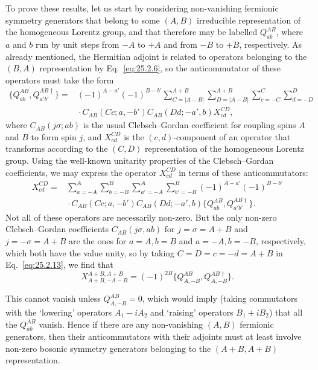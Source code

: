 To prove these results, let us start by considering non-vanishing fermionic
symmetry generators that belong to some \((A,B)\) irreducible representation
of the homogeneous Lorentz group, and that therefore may be labelled
\(Q_{ab}^{AB}\), where \(a\) and \(b\) run by unit steps from \(-A\) to
\(+A\) and from \(-B\) to \(+B\), respectively. As already mentioned, the
Hermitian adjoint is related to operators belonging to the \((B,A)\)
representation by Eq.~\eqref{eq:25.2.6}, so the anticommutator of these
operators must take the form
\begin{equation}
\begin{aligned}
\{Q_{ab}^{AB},Q_{a'b'}^{AB\dagger}\}
={}&(-1)^{A-a'}(-1)^{B-b'}
\sum_{C=|A-B|}^{A+B}
\sum_{D=|A-B|}^{A+B}
\sum_{c=-C}^{C}
\sum_{d=-D}^{D}
\\
&{}\cdot C_{AB}(Cc;a,-b')C_{AB}(Dd;-a',b)X_{cd}^{CD},
\end{aligned}
\tag{25.2.12}\label{eq:25.2.12}
\end{equation}
where \(C_{AB}(j\sigma;ab)\) is the usual Clebsch--Gordan coefficient for
coupling spins \(A\) and \(B\) to form spin \(j\), and \(X_{cd}^{CD}\) is
the \((c,d)\)-component of an operator that transforms according to the
\((C,D)\) representation of the homogeneous Lorentz group. Using the
well-known unitarity properties of the Clebsch--Gordan coefficients, we may
express the operator \(X_{cd}^{CD}\) in terms of these anticommutators:
\begin{equation}
\begin{aligned}
X_{cd}^{CD}
={}&
\sum_{a=-A}^{A}
\sum_{b=-B}^{B}
\sum_{a'=-A}^{A}
\sum_{b'=-B}^{B}
(-1)^{A-a'}(-1)^{B-b'}
\\
&{}\cdot C_{AB}(Cc;a,-b')C_{AB}(Dd;-a',b)
\{Q_{ab}^{AB},Q_{a'b'}^{AB\dagger}\}.
\end{aligned}
\tag{25.2.13}\label{eq:25.2.13}
\end{equation}
Not all of these operators are necessarily non-zero. But the only non-zero
Clebsch--Gordan coefficients \(C_{AB}(j\sigma,ab)\) for
\(j=\sigma=A+B\) and \(j=-\sigma=A+B\) are the ones for
\(a=A,b=B\) and \(a=-A,b=-B\), respectively, which both have the value
unity, so by taking \(C=D=c=-d=A+B\) in Eq.~\eqref{eq:25.2.13}, we find
that
\begin{equation}
X_{A+B,-A-B}^{A+B,A+B}
=(-1)^{2B}\{Q_{A,-B}^{AB},Q_{A,-B}^{AB\dagger}\}.
\tag{25.2.14}\label{eq:25.2.14}
\end{equation}

This cannot vanish unless \(Q_{A,-B}^{AB}=0\), which would imply (taking
commutators with the `lowering' operators \(A_1-iA_2\) and `raising'
operators \(B_1+iB_2\)) that all the \(Q_{ab}^{AB}\) vanish. Hence if
there are any non-vanishing \((A,B)\) fermionic generators, then their
anticommutators with their adjoints must at least involve non-zero bosonic
symmetry generators belonging to the \((A+B,A+B)\) representation.

